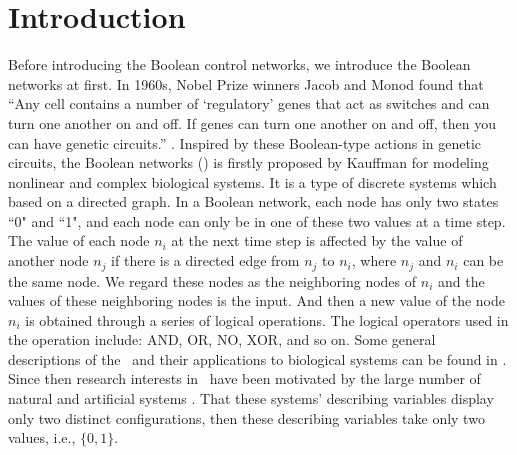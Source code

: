 \section{Introduction}
\label{sec:intro}

Before introducing the Boolean control networks, we introduce the Boolean networks at first. In 1960s, Nobel Prize winners Jacob and Monod found that ``Any cell contains a number of `regulatory' genes that act as switches and can turn one another on and off. If genes can turn one another on and off, then you can have genetic circuits.'' \cite{Jacob1961Genetic}. Inspired by these Boolean-type actions in genetic circuits, the Boolean networks (\BNs) is firstly proposed by Kauffman \cite{Kauffman1968Metabolic} for modeling nonlinear and complex biological systems. It is a type of discrete systems which based on a directed graph. In a Boolean network, each node has only two states ``0" and ``1", and each node can only be in one of these two values at a time step. The value of each node $n_i$ at the next time step is affected by the value of another node $n_j$ if there is a directed edge from $n_j$ to $n_i$, where $n_j$ and $n_i$ can be the same node. We regard these nodes as the neighboring nodes of $n_i$ and the values of these neighboring nodes is the input. And then a new value of the node $n_i$ is obtained through a series of logical operations. The logical operators used in the operation include: AND, OR, NO, XOR, and so on. Some general descriptions of the \BNs\ and their applications to biological systems can be found in \cite{Kauffman1968Metabolic}. Since then research interests in \BNs\ have been motivated by the large number of natural and artificial systems \cite{Akutsu2000Inferring, Shmulevich2002From, Faur2006Dynamical,Green2007The,Lou2010Multi}. That these systems' describing variables display only two distinct configurations, then these describing variables take only two values, i.e., $\{0,1\}$.

